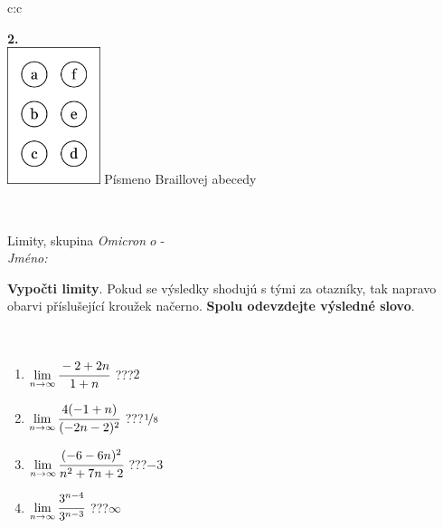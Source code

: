 \documentclass[10pt]{report}
\newcommand\omicron{o}
\begin{document}
\begin{tabular}{c:c}
\begin{minipage}[c][104.5mm][t]{0.5\linewidth}
\begin{center}
\begin{minipage}{0.20\linewidth}
\begin{center}
{\Huge\bfseries 2.} \\[2mm]
\includegraphics[height=40mm]{../images/braille.png}
{\small Písmeno Braillovej abecedy}
\end{center}
\end{minipage}
\end{center}
\end{minipage}
\\ \hdashline
\begin{minipage}[c][104.5mm][t]{0.5\linewidth}
\begin{center}
\vspace{7mm}
{\huge Limity, skupina \textit{Omicron $\omicron$} -}\\[5mm]
\textit{Jméno:}\phantom{xxxxxxxxxxxxxxxxxxxxxxxxxxxxxxxxxxxxxxxxxxxxxxxxxxxxxxxxxxxxxxxxx}\\[5mm]
\begin{minipage}{0.95\linewidth}
\begin{center}
\textbf{Vypočti limity}. Pokud se výsledky shodujú s tými za otazníky, tak napravo\\obarvi příslušející kroužek načerno. \textbf{Spolu odevzdejte výsledné slovo}.
\end{center}
\end{minipage}
\\[1mm]
\begin{minipage}{0.79\linewidth}
\begin{center}
\begin{varwidth}{\linewidth}
\begin{enumerate}
\normalsize
\item $\lim\limits_{n\to\infty}\cfrac{-2+2n}{1+n}$\quad \dotfill\; ???\;\dotfill \quad $2$
\item $\lim\limits_{n\to\infty}\cfrac{4(-1+n)}{(-2n-2)^2}$\quad \dotfill\; ???\;\dotfill \quad $\nicefrac{1}{8}$
\item $\lim\limits_{n\to\infty}\cfrac{(-6-6n)^2}{n^2+7n+2}$\quad \dotfill\; ???\;\dotfill \quad $-3$
\item $\lim\limits_{n\to\infty}\cfrac{3^{n-4}}{3^{n-3}}$\quad \dotfill\; ???\;\dotfill \quad $\infty$

\end{enumerate}
\end{varwidth}
\end{center}
\end{minipage}
\end{center}
\end{minipage}
\end{tabular}
\end{document}
